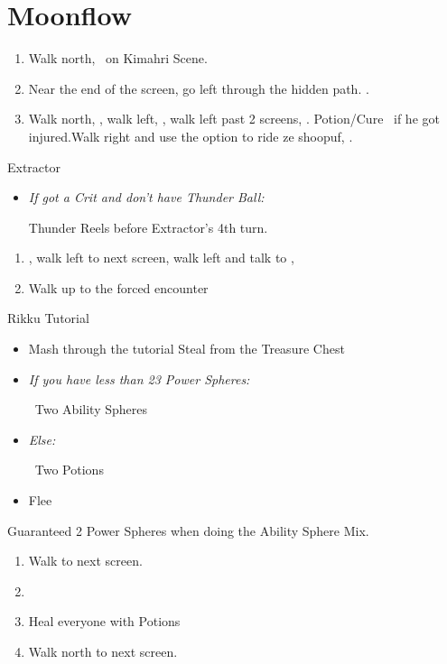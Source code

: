 \chapter{Moonflow}

\begin{enumerate}
	\item Walk north, \sd\ on Kimahri Scene.
	\item Near the end of the screen, go left through the hidden path. .
	\item Walk north, \sd, walk left, \sd, walk left past 2 screens, \sd.  Potion/Cure \tidus\ if he got injured.Walk right and use the  option to ride ze shoopuf, \sd.
\end{enumerate}
\begin{battle}[4000]{Extractor}
	\begin{itemize}
		\tidusf Haste self, then \wakka
		\wakkaf Attack
		\tidusf \textit{If Lightning Steel:}
		\begin{itemize}
			\item Cheer x1
		\end{itemize}
		\textit{Else:}
		\begin{itemize}
			\item Cheer x4
		\end{itemize}
		\tidusf Attack
		\item \textit{If got a Crit and don't have Thunder Ball:}
		\begin{itemize}
			\wakkaf \od Thunder Reels before Extractor's 4th turn.
		\end{itemize}
	\end{itemize}
\end{battle}
\begin{enumerate}[resume]
	\item \sd, walk left to next screen, walk left and talk to \rikku, \sd
	\item Walk up to the forced encounter
\end{enumerate}
\begin{battle}{Rikku Tutorial}
	\begin{itemize}
		\item Mash through the tutorial
		\rikkuf Steal from the Treasure Chest
		\item \textit{If you have less than 23 Power Spheres:}
		      \begin{itemize}
			      \rikkuf \od\ Two Ability Spheres
		      \end{itemize}
		\item \textit{Else:}
		      \begin{itemize}
			      \rikkuf \od\ Two Potions
		      \end{itemize}
		\item Flee
	\end{itemize}
Guaranteed 2 Power Spheres when doing the Ability Sphere Mix.
\end{battle}
\begin{enumerate}[resume]
	\item Walk to next screen.
	\item \formation{\tidus}{\wakka}{\auron}
	\item Heal everyone with Potions
	\item Walk north to next screen.
\end{enumerate}